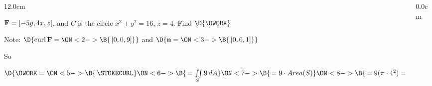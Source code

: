 %
%
%
%
%	

\begin{frame}
\begin{columns}\begin{column}{12.0cm}
\scriptsize

\EX ${\bf F} = [-5y,4x,z]$, and $C$ is the circle $x^2 + y^2 = 16$, $z=4$. \quad Find $\D{\OWORK}$

\vspace{0.4cm}

Note:
$\D{
\text{curl}\, {\bf F} =
\ON<2->{\B{\, [0,0,9]}}}$ \quad and $\D{{\bf n} = 
\ON<3->{\B{\,[0,0,1]}}}$

\vspace{0.4cm}

So 

\vspace{0.4cm}

$\D{\OWORK = 
\ON<5->{\B{\,\STOKECURL}}
\ON<6->{\B{\, = \iint \limits_{S} 9\, dA}}
\ON<7->{\B{\, = 9 \cdot Area(S)}}
\ON<8->{\B{\, = 9 (\pi \cdot 4^2) = 144 \pi}}}$

\vspace{9.2cm}

\end{column}\begin{column}{0.0cm}\end{column}\end{columns}
\end{frame}

